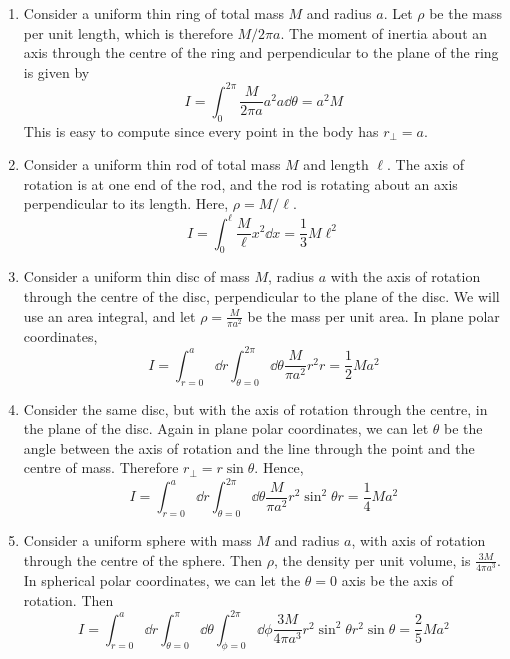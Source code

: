 \begin{enumerate}
	\item Consider a uniform thin ring of total mass \(M\) and radius \(a\).
	      Let \(\rho\) be the mass per unit length, which is therefore \(M/2\pi a\).
	      The moment of inertia about an axis through the centre of the ring and perpendicular to the plane of the ring is given by
	      \[
		      I = \int_0^{2\pi} \frac{M}{2\pi a} a^2 a \dd{\theta} = a^2 M
	      \]
	      This is easy to compute since every point in the body has \(r_\perp = a\).
	\item Consider a uniform thin rod of total mass \(M\) and length \(\ell\).
	      The axis of rotation is at one end of the rod, and the rod is rotating about an axis perpendicular to its length.
	      Here, \(\rho = M/\ell\).
	      \[
		      I = \int_0^\ell \frac{M}{\ell} x^2 \dd{x} = \frac{1}{3}M\ell^2
	      \]
	\item Consider a uniform thin disc of mass \(M\), radius \(a\) with the axis of rotation through the centre of the disc, perpendicular to the plane of the disc.
	      We will use an area integral, and let \(\rho = \frac{M}{\pi a^2}\) be the mass per unit area.
	      In plane polar coordinates,
	      \[
		      I = \int_{r=0}^a \dd{r} \int_{\theta = 0}^{2 \pi} \dd{\theta} \frac{M}{\pi a^2} r^2 r = \frac{1}{2}Ma^2
	      \]
	\item Consider the same disc, but with the axis of rotation through the centre, in the plane of the disc.
	      Again in plane polar coordinates, we can let \(\theta\) be the angle between the axis of rotation and the line through the point and the centre of mass.
	      Therefore \(r_\perp = r\sin\theta\).
	      Hence,
	      \[
		      I = \int_{r=0}^a \dd{r} \int_{\theta = 0}^{2 \pi} \dd{\theta} \frac{M}{\pi a^2} r^2 \sin^2\theta r = \frac{1}{4}Ma^2
	      \]
	\item Consider a uniform sphere with mass \(M\) and radius \(a\), with axis of rotation through the centre of the sphere.
	      Then \(\rho\), the density per unit volume, is \(\frac{3M}{4\pi a^3}\).
	      In spherical polar coordinates, we can let the \(\theta = 0\) axis be the axis of rotation.
	      Then
	      \[
		      I = \int_{r=0}^a \dd{r} \int_{\theta = 0}^{\pi} \dd{\theta} \int_{\phi = 0}^{2 \pi} \dd{\phi} \frac{3M}{4\pi a^3} r^2 \sin^2 \theta r^2\sin\theta = \frac{2}{5}Ma^2
	      \]
\end{enumerate}
